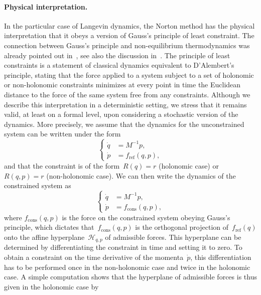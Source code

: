 \paragraph{Physical interpretation.}
In the particular case of Langevin dynamics, the Norton method has the physical interpretation that it obeys a version of Gauss's principle of least constraint. The connection between Gauss's principle and non-equilibrium thermodynamics was already pointed out in~\cite{EHFML83}, see also the discussion in~\cite[Section~5.2]{EM08}.
The principle of least constraints is a statement of classical dynamics equivalent to D'Alembert's principle, stating that the force applied to a system subject to a set of holonomic or non-holonomic constraints minimizes at every point in time the Euclidean distance to the force of the same system free from any constraints. Although we describe this interpretation in a deterministic setting, we stress that it remains valid, at least on a formal level,  upon considering a stochastic version of the dynamics.
More precisely, we assume that the dynamics for the unconstrained system can be written under the form
\begin{equation}
\label{04:eq:unconstrained_dynamics}
    \left\{
    \begin{aligned}
        \dot q &= M^{-1}p,\\
        \dot p &= f_{\mathrm{ref}}(q,p),
    \end{aligned}
    \right.
\end{equation}
and that the constraint is of the form~$R(q)=r$ (holonomic case) or~$R(q,p)=r$ (non-holonomic case). We can then write the dynamics of the constrained system as 
\begin{equation}
\label{04:eq:constrained_dynamics}
    \left\{
    \begin{aligned}
        \dot q &= M^{-1}p,\\
        \dot p &= f_{\mathrm{cons}}(q,p),
    \end{aligned}
    \right.
\end{equation}
where $f_{\mathrm{cons}}(q,p)$ is the force on the constrained system obeying Gauss's principle, which dictates that~$f_{\mathrm{cons}}(q,p)$ is the orthogonal projection of~$f_{\mathrm{ref}}(q)$ onto the affine hyperplane~$\mathcal{H}_{q,p}$ of admissible forces. This hyperplane can be determined by differentiating the constraint in time and setting it to zero. To obtain a constraint on the time derivative of the momenta~$\dot p$, this differentiation has to be performed once in the non-holonomic case and twice in the holonomic case. A simple computation shows that the hyperplane of admissible forces is thus given in the holonomic case by
